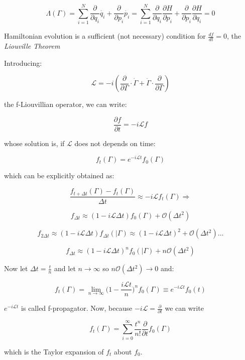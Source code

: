 \documentclass{article}
\begin{document}
$$ \Lambda(\Gamma) = \sum_{i=1}^{N} \frac{\partial}{\partial q_i} \dot{q_i} +  \frac{\partial}{\partial p_i} \dot{p_i}= \sum_{i=1}^{N} \frac{\partial}{\partial q_i} \frac{\partial H}{\partial p_i} +  \frac{\partial}{\partial p_i}\frac{\partial H}{\partial q_i} = 0$$

Hamiltonian evolution is a sufficient (not necessary) condition for $ \frac{df}{dt}=0$, the \emph{Liouville Theorem}

Introducing:

\begin{equation}
\mathcal{L}= -i (\frac{\partial}{\partial \Gamma} \cdot \dot{\Gamma} + \dot{\Gamma} \cdot \frac{\partial}{\partial \Gamma})
\end{equation}

the f-Liouvillian operator, we can write:

\begin{equation}
\frac{\partial f}{\partial t} = - i \mathcal{L} f
\end{equation}

whose solution is, if $\mathcal{L}$ does not depends on time:

$$f_t(\Gamma) = e^{-i \mathcal{L} t } f_0(\Gamma)$$

which can be explicitly obtained as:

$$ \frac{f_{t+\Delta t}(\Gamma) - f_t(\Gamma) }{\Delta t}\approx - i \mathcal{L} f_t(\Gamma) \Rightarrow $$

$$ f_{\Delta t} \approx (1-i\mathcal{L} \Delta t)f_0(\Gamma) + \mathcal{O}(\Delta t^2)$$

$$ f_{2 \Delta t} \approx (1-i\mathcal{L} \Delta t)f_{ \Delta t}(|\Gamma) \approx  (1-i\mathcal{L} \Delta t)^2 + \mathcal{O}(\Delta t^2) ... $$

$$ f_{\Delta t} \approx (1-i\mathcal{L} \Delta t)^n f_0(|\Gamma) + n \mathcal{O}(\Delta t^2)$$

Now let $\Delta t = \frac{t}{n}$ and let $n \to \infty$ so $
n \mathcal{O}(\Delta t^2) \to 0 $ and:

$$ f_t(\Gamma) = \lim\limits_{n \to \infty} \big (1 - \frac{i \mathcal{L} t}{n} \big )^n f_0(\Gamma) \equiv e^{- i \mathcal{L} t} f_0(t)$$

$e^{- i \mathcal{L} t} $ is called f-propagator. Now, because $-i \mathcal{L} = \frac{\partial}{\partial t}$ we can write 

$$ f_t(\Gamma) = \sum_{i=0}^{\infty} \frac{t^n}{n!} \frac{\partial}{\partial t} f_0(\Gamma)$$

which is the Taylor expansion of $f_t$ about $f_0$.
\end{document}
